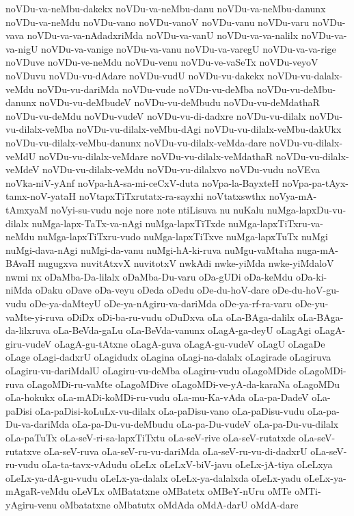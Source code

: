 {noVDu-va-neMbu-dakekx
noVDu-va-neMbu-danu
noVDu-va-neMbu-danunx
noVDu-va-neMdu
noVDu-vano
noVDu-vanoV
noVDu-vanu
noVDu-varu
noVDu-vava
noVDu-va-va-nAdadxriMda
noVDu-va-vanU
noVDu-va-va-nalilx
noVDu-va-va-nigU
noVDu-va-vanige
noVDu-va-vanu
noVDu-va-varegU
noVDu-va-va-rige
noVDuve
noVDu-ve-neMdu
noVDu-venu
noVDu-ve-vaSeTx
noVDu-veyoV
noVDuvu
noVDu-vu-dAdare
noVDu-vudU
noVDu-vu-dakekx
noVDu-vu-dalalx-veMdu
noVDu-vu-dariMda
noVDu-vude
noVDu-vu-deMba
noVDu-vu-deMbu-danunx
noVDu-vu-deMbudeV
noVDu-vu-deMbudu
noVDu-vu-deMdathaR
noVDu-vu-deMdu
noVDu-vudeV
noVDu-vu-di-dadxre
noVDu-vu-dilalx
noVDu-vu-dilalx-veMba
noVDu-vu-dilalx-veMbu-dAgi
noVDu-vu-dilalx-veMbu-dakUkx
noVDu-vu-dilalx-veMbu-danunx
noVDu-vu-dilalx-veMda-dare
noVDu-vu-dilalx-veMdU
noVDu-vu-dilalx-veMdare
noVDu-vu-dilalx-veMdathaR
noVDu-vu-dilalx-veMdeV
noVDu-vu-dilalx-veMdu
noVDu-vu-dilalxvo
noVDu-vudu
noVEva
noVka-niV-yAnf
noVpa-hA-sa-mi-ceCxV-duta
noVpa-la-BayxteH
noVpa-pa-tAyx-tamx-noV-yataH
noVtapxTiTxrutatx-ra-sayxhi
noVtatxswthx
noVya-mA-tAmxyaM
noVyi-su-vudu
noje
nore
note
ntiLisuva
nu
nuKalu
nuMga-lapxDu-vu-dilalx
nuMga-lapx-TaTx-va-nAgi
nuMga-lapxTiTxde
nuMga-lapxTiTxru-va-neMdu
nuMga-lapxTiTxru-vudo
nuMga-lapxTiTxve
nuMga-lapxTuTx
nuMgi
nuMgi-dava-nAgi
nuMgi-da-vanu
nuMgi-hA-ki-ruva
nuMgu-vaMtaha
nuga-mA-BAvaH
nugugxva
nuvitAtxvX
nuvitotxV
nwkAdi
nwke-yiMda
nwke-yiMdaloV
nwmi
nx
oDaMba-Da-lilalx
oDaMba-Du-varu
oDa-gUDi
oDa-keMdu
oDa-ki-niMda
oDaku
oDave
oDa-veyu
oDeda
oDedu
oDe-du-hoV-dare
oDe-du-hoV-gu-vudu
oDe-ya-daMteyU
oDe-ya-nAgiru-va-dariMda
oDe-ya-rf-ra-varu
oDe-yu-vaMte-yi-ruva
oDiDx
oDi-ba-ru-vudu
oDuDxva
oLa
oLa-BAga-dalilx
oLa-BAga-da-lilxruva
oLa-BeVda-gaLu
oLa-BeVda-vanunx
oLagA-ga-deyU
oLagAgi
oLagA-giru-vudeV
oLagA-gu-tAtxne
oLagA-guva
oLagA-gu-vudeV
oLagU
oLagaDe
oLage
oLagi-dadxrU
oLagidudx
oLagina
oLagi-na-dalalx
oLagirade
oLagiruva
oLagiru-vu-dariMdalU
oLagiru-vu-deMba
oLagiru-vudu
oLagoMDide
oLagoMDi-ruva
oLagoMDi-ru-vaMte
oLagoMDive
oLagoMDi-ve-yA-da-karaNa
oLagoMDu
oLa-hokukx
oLa-mADi-koMDi-ru-vudu
oLa-mu-Ka-vAda
oLa-pa-DadeV
oLa-paDisi
oLa-paDisi-koLuLx-vu-dilalx
oLa-paDisu-vano
oLa-paDisu-vudu
oLa-pa-Du-va-dariMda
oLa-pa-Du-vu-deMbudu
oLa-pa-Du-vudeV
oLa-pa-Du-vu-dilalx
oLa-paTuTx
oLa-seV-ri-sa-lapxTiTxtu
oLa-seV-rive
oLa-seV-rutatxde
oLa-seV-rutatxve
oLa-seV-ruva
oLa-seV-ru-vu-dariMda
oLa-seV-ru-vu-di-dadxrU
oLa-seV-ru-vudu
oLa-ta-tavx-vAdudu
oLeLx
oLeLxV-biV-javu
oLeLx-jA-tiya
oLeLxya
oLeLx-ya-dA-gu-vudu
oLeLx-ya-dalalx
oLeLx-ya-dalalxda
oLeLx-yadu
oLeLx-ya-mAgaR-veMdu
oLeVLx
oMBatatxne
oMBatetx
oMBeY-nUru
oMTe
oMTi-yAgiru-venu
oMbatatxne
oMbatutx
oMdAda
oMdA-darU
oMdA-dare
}
